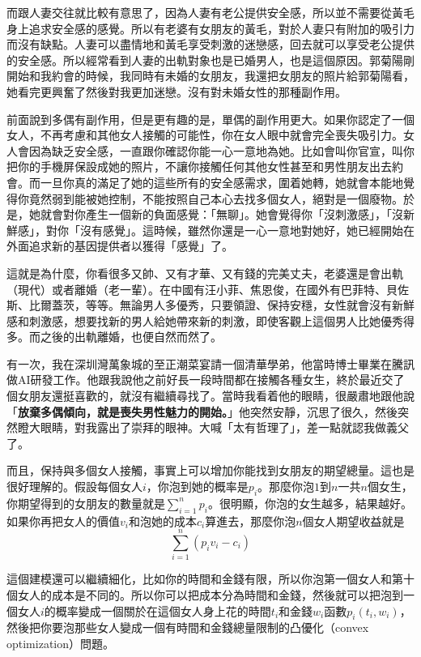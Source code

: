 而跟人妻交往就比較有意思了，因為人妻有老公提供安全感，所以並不需要從黃毛身上追求安全感的感覺。所以有老婆有女朋友的黃毛，對於人妻只有附加的吸引力而沒有缺點。人妻可以盡情地和黃毛享受刺激的迷戀感，回去就可以享受老公提供的安全感。所以經常看到人妻的出軌對象也是已婚男人，也是這個原因。郭菊陽剛開始和我約會的時候，我同時有未婚的女朋友，我還把女朋友的照片給郭菊陽看，她看完更興奮了然後對我更加迷戀。沒有對未婚女性的那種副作用。

前面說到多偶有副作用，但是更有趣的是，單偶的副作用更大。如果你認定了一個女人，不再考慮和其他女人接觸的可能性，你在女人眼中就會完全喪失吸引力。女人會因為缺乏安全感，一直跟你確認你能一心一意地為她。比如會叫你官宣，叫你把你的手機屏保設成她的照片，不讓你接觸任何其他女性甚至和男性朋友出去約會。而一旦你真的滿足了她的這些所有的安全感需求，圍着她轉，她就會本能地覺得你竟然弱到能被她控制，不能按照自己本心去找多個女人，絕對是一個廢物。於是，她就會對你產生一個新的負面感覺：「無聊」。她會覺得你「沒刺激感」，「沒新鮮感」，對你「沒有感覺」。這時候，雖然你還是一心一意地對她好，她已經開始在外面追求新的基因提供者以獲得「感覺」了。

這就是為什麼，你看很多又帥、又有才華、又有錢的完美丈夫，老婆還是會出軌（現代）或者離婚（老一輩）。在中國有汪小菲、焦恩俊，在國外有巴菲特、貝佐斯、比爾蓋茨，等等。無論男人多優秀，只要領證、保持安穩，女性就會沒有新鮮感和刺激感，想要找新的男人給她帶來新的刺激，即使客觀上這個男人比她優秀得多。而之後的出軌離婚，也便自然而然了。

有一次，我在深圳灣萬象城的至正潮菜宴請一個清華學弟，他當時博士畢業在騰訊做AI研發工作。他跟我說他之前好長一段時間都在接觸各種女生，終於最近交了個女朋友還挺喜歡的，就沒有繼續尋找了。當時我看着他的眼睛，很嚴肅地跟他說「\textbf{放棄多偶傾向，就是喪失男性魅力的開始。}」他突然安靜，沉思了很久，然後突然瞪大眼睛，對我露出了崇拜的眼神。大喊「太有哲理了」，差一點就認我做義父了。

而且，保持與多個女人接觸，事實上可以增加你能找到女朋友的期望總量。這也是很好理解的。假設每個女人$i$，你泡到她的概率是$p_i$。那麼你泡$1$到$n$一共$n$個女生，你期望得到的女朋友的數量就是$\sum_{i=1}^n p_i$。很明顯，你泡的女生越多，結果越好。如果你再把女人的價值$v_i$和泡她的成本$c_i$算進去，那麼你泡$n$個女人期望收益就是
$$\sum_{i=1}^n \left(p_i v_i - c_i\right)$$

這個建模還可以繼續細化，比如你的時間和金錢有限，所以你泡第一個女人和第十個女人的成本是不同的。所以你可以把成本分為時間和金錢，然後就可以把泡到一個女人$i$的概率變成一個關於在這個女人身上花的時間$t_i$和金錢$w_i$函數$p_i(t_i, w_i)$，然後把你要泡那些女人變成一個有時間和金錢總量限制的凸優化（convex optimization）問題。

